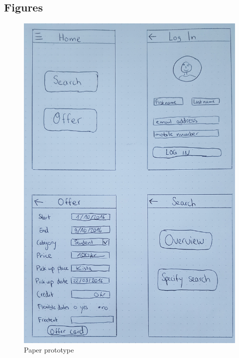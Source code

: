 \documentclass[11pt,twoside,a4paper]{report}
\begin{document}
\begin{appendices}

\chapter{Figures}
\label{appendix}

\thispagestyle{empty}

\begin{figure}
	\centering
	\includegraphics[width=\textwidth]{paper-prototype-1.jpg}
	\caption{Paper prototype}
	\label{figure:paper-prototype-1}
\end{figure}


\end{appendices}
\end{document}

